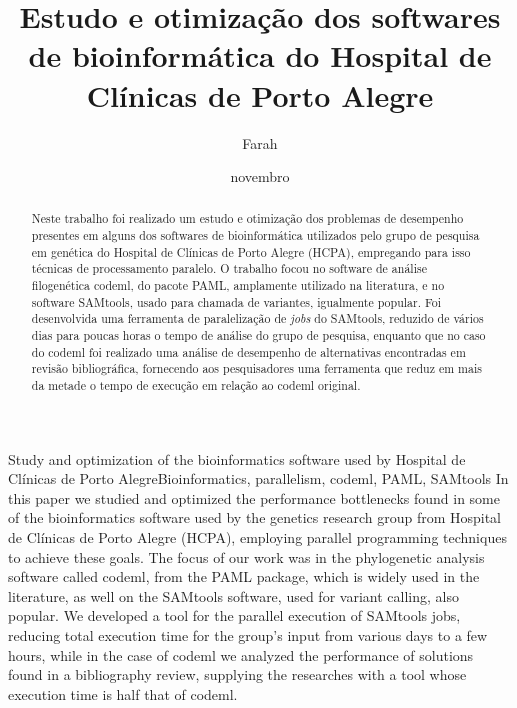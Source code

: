 \documentclass[cic,tc]{iiufrgs}
\title{Estudo e otimização dos softwares de bioinformática do Hospital de
Clínicas de Porto Alegre}
\author{Farah}{Alef}
\date{novembro}{2021}
\begin{document}
\maketitle



\begin{abstract}
  Neste trabalho foi realizado um estudo e otimização dos problemas de
  desempenho presentes em alguns dos softwares de bioinformática utilizados
  pelo grupo de pesquisa em genética do Hospital de Clínicas de Porto Alegre
  (HCPA), empregando para isso técnicas de processamento paralelo. O trabalho
  focou no software de análise filogenética codeml, do pacote PAML, amplamente
  utilizado na literatura, e no software SAMtools, usado para chamada de
  variantes, igualmente popular. Foi desenvolvida uma ferramenta de
  paralelização de \textit{jobs} do SAMtools, reduzido de vários dias para
  poucas horas o tempo de análise do grupo de pesquisa, enquanto que no caso do
  codeml foi realizado uma análise de desempenho de alternativas encontradas em
  revisão bibliográfica, fornecendo aos pesquisadores uma ferramenta que reduz
  em mais da metade o tempo de execução em relação ao codeml original.
  \end{abstract}

\begin{englishabstract}{Study and optimization of the bioinformatics software used by Hospital de Clínicas de Porto Alegre}{Bioinformatics, parallelism, codeml, PAML, SAMtools} In this paper we studied and optimized the performance bottlenecks found in some of the bioinformatics software used by the genetics research group from Hospital de Clínicas de Porto Alegre (HCPA), employing parallel programming techniques to achieve these goals. The focus of our work was in the phylogenetic analysis software called codeml, from the PAML package, which is widely used in the literature, as well on the SAMtools software, used for variant calling, also popular. We developed a tool for the parallel execution of SAMtools jobs, reducing total execution time for the group's input from various days to a few hours, while in the case of codeml we analyzed the performance of solutions found in a bibliography review, supplying the researches with a tool whose execution time is half that of codeml.
\end{englishabstract}
\end{document}

